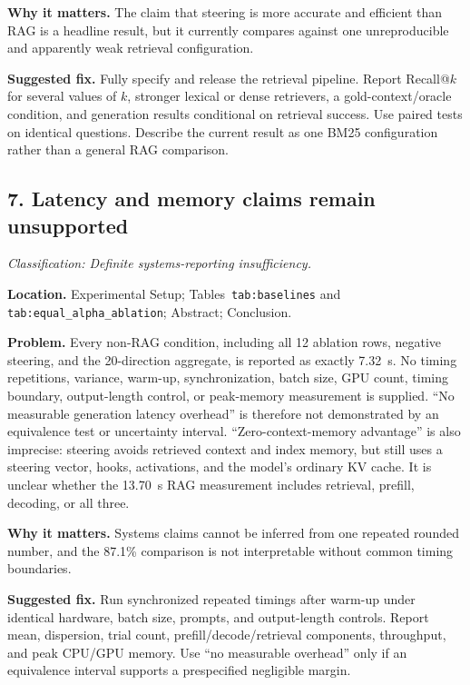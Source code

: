 \documentclass[11pt]{article}
\newcommand{\findinglabel}[1]{\textbf{#1}}
\newcommand{\classification}[1]{\textit{Classification: #1.}}
\begin{document}
\findinglabel{Why it matters.} The claim that steering is more accurate and efficient than RAG is a headline result, but it currently compares against one unreproducible and apparently weak retrieval configuration.

\findinglabel{Suggested fix.} Fully specify and release the retrieval pipeline.  Report Recall@$k$ for several values of $k$, stronger lexical or dense retrievers, a gold-context/oracle condition, and generation results conditional on retrieval success.  Use paired tests on identical questions.  Describe the current result as one BM25 configuration rather than a general RAG comparison.

\subsection*{7. Latency and memory claims remain unsupported}

\classification{Definite systems-reporting insufficiency}

\findinglabel{Location.} Experimental Setup; Tables~\texttt{tab:baselines} and \texttt{tab:equal\_alpha\_ablation}; Abstract; Conclusion.

\findinglabel{Problem.} Every non-RAG condition, including all 12 ablation rows, negative steering, and the 20-direction aggregate, is reported as exactly 7.32~s.  No timing repetitions, variance, warm-up, synchronization, batch size, GPU count, timing boundary, output-length control, or peak-memory measurement is supplied.  ``No measurable generation latency overhead'' is therefore not demonstrated by an equivalence test or uncertainty interval.  ``Zero-context-memory advantage'' is also imprecise: steering avoids retrieved context and index memory, but still uses a steering vector, hooks, activations, and the model's ordinary KV cache.  It is unclear whether the 13.70~s RAG measurement includes retrieval, prefill, decoding, or all three.

\findinglabel{Why it matters.} Systems claims cannot be inferred from one repeated rounded number, and the 87.1\% comparison is not interpretable without common timing boundaries.

\findinglabel{Suggested fix.} Run synchronized repeated timings after warm-up under identical hardware, batch size, prompts, and output-length controls.  Report mean, dispersion, trial count, prefill/decode/retrieval components, throughput, and peak CPU/GPU memory.  Use ``no measurable overhead'' only if an equivalence interval supports a prespecified negligible margin.
\end{document}
